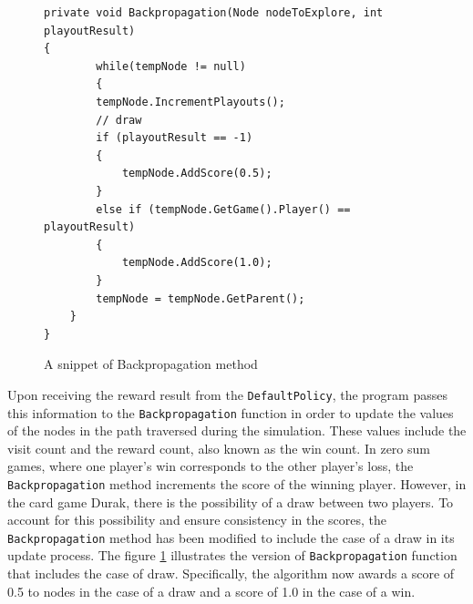 \begin{figure}[h]
\captionsetup{justification=centering}
\begin{lstlisting}
private void Backpropagation(Node nodeToExplore, int playoutResult)
{
    	while(tempNode != null)
    	{
		tempNode.IncrementPlayouts();
		// draw
		if (playoutResult == -1)
		{
			tempNode.AddScore(0.5);
		} 
		else if (tempNode.GetGame().Player() == playoutResult)
		{
			tempNode.AddScore(1.0);
		}
		tempNode = tempNode.GetParent();
	}
}
\end{lstlisting}
\caption{A snippet of Backpropagation method}
\label{fig:mctsBackpropagation}
\end{figure}

Upon receiving the reward result from the \texttt{DefaultPolicy}, the program passes this information to the \texttt{Backpropagation} function in order to update the values of the nodes in the path traversed during the simulation. These values include the visit count and the reward count, also known as the win count. In zero sum games, where one player's win corresponds to the other player's loss, the \texttt{Backpropagation} method increments the score of the winning player. However, in the card game Durak, there is the possibility of a draw between two players. To account for this possibility and ensure consistency in the scores, the \texttt{Backpropagation} method has been modified to include the case of a draw in its update process. The figure \ref{fig:mctsBackpropagation} illustrates the version of \texttt{Backpropagation} function that includes the case of draw. Specifically, the algorithm now awards a score of 0.5 to nodes in the case of a draw and a score of 1.0 in the case of a win.  


